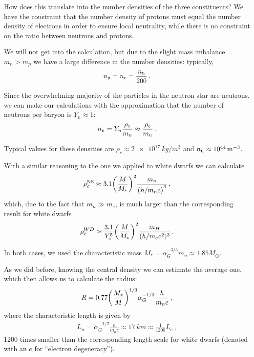 \documentclass[main.tex]{subfiles}
\begin{document}
How does this translate into the number densities of the three constituents? We have the constraint that the number density of protons must equal the number density of electrons in order to ensure local neutrality, while there is no constraint on the ratio between neutrons and protons.

We will not get into the calculation, but due to the slight mass imbalance \(m_n > m_p\) we have a large difference in the number densities: typically,
%
\begin{align}
n_{\ce{p}} = n_{\ce{e}} = \frac{n_{\ce{n}}}{200}
\,.
\end{align}

Since the overwhelming majority of the particles in the neutron star are neutrons, we can make our calculations with the approximation that the number of neutrons per baryon is \(Y_n \approx 1\): 
%
\begin{align}
n_{\ce{n}} = Y_n \frac{\rho_{c}}{m_{\ce{n}}} \approx \frac{\rho_{c}}{m_{\ce{n}}}
\,.
\end{align}

Typical values for these densities are \(\rho_c \approx \SI{2e17}{kg/m^3}\) and \(n_{\ce{n}} \approx \SI{e44}{m^{-3}}\).

With a similar reasoning to the one we applied to white dwarfs we can calculate
%
\begin{align}
\rho_{c}^{\text{NS}} \approx 3.1 \qty(\frac{M}{M_{*}})^2 \frac{m_n}{\qty(h / m_n c)^3}
\,,
\end{align}
%
which, due to the fact that \(m_{n} \gg m_e\), is much larger than the corresponding result for white dwarfs 
%
\begin{align}
\rho_{c}^{WD} \approx \frac{3.1}{Y_e^{5}} \qty(\frac{M}{M_{*}})^2 \frac{m_H}{(h / m_e c^2)^{3}}
\,.
\end{align}

In both cases, we used the characteristic mass \(M_{*} = \alpha_{G}^{-3 /5 } m_n \approx 1.85 M_{\odot}\).

As we did before, knowing the central density we can estimate the average one, which then allows us to calculate the radius:
%
\begin{align}
R = \num{.77} \qty(\frac{M_{*}}{M})^{1/3} \alpha_{G}^{-1/2}  \frac{h}{m_n c}
\,,
\end{align}
%
where the characteristic length is given by 
%
\begin{align}
L_n = \alpha_{G}^{-1/2} \frac{h}{m_n c} \approx \SI{17}{km} \approx \frac{1}{1200} L_e
\,,
\end{align}
%
1200 times smaller than the corresponding length scale for white dwarfs (denoted with an \(e\) for ``electron degeneracy'').
\end{document}
